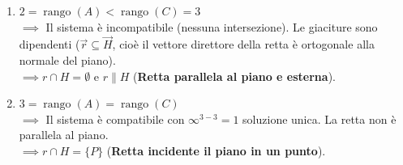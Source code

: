 {\begin{enumerate}
        \item \( 2 = \operatorname{rango}(A) < \operatorname{rango}(C) = 3 \) \\
        \(\implies\) Il sistema è incompatibile (nessuna intersezione).
        Le giaciture sono dipendenti (\(\vec{r} \subseteq \vec{H}\), cioè il vettore direttore della retta è ortogonale alla normale del piano). \\
        \(\implies r \cap H = \emptyset\) e \(r \parallel H\) (\textbf{Retta parallela al piano e esterna}).

        \item \( 3 = \operatorname{rango}(A) = \operatorname{rango}(C) \) \\
        \(\implies\) Il sistema è compatibile con \(\infty^{3-3}=1\) soluzione unica. La retta non è parallela al piano. \\
        \(\implies r \cap H = \{P\}\) (\textbf{Retta incidente il piano in un punto}).
    \end{enumerate}
}

